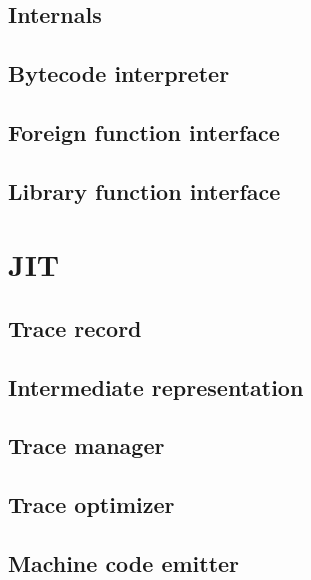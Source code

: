 \documentclass[12pt, oneside]{Thesis}
\begin{document}
  \chapter{Internals}
  \label{Chapt:Internals}
  

  \chapter{Bytecode interpreter}
  \label{Chapt:BI}
  

  \chapter{Foreign function interface}
  \label{Chapt:FFI}

  \chapter{Library function interface}
  \label{Chapt:LFI}

\part{JIT}
\label{Part:JIT}

  \chapter{Trace record}
  \label{Chapt:TR}
  

  \chapter{Intermediate representation}
  \label{Chapt:IR}
  

  \chapter{Trace manager}
  \label{Chapt:TM}
  

  \chapter{Trace optimizer}
  \label{Chapt:TO}
  

  \chapter{Machine code emitter}
  \label{Chapt:mcode}
\clearpage
{}
\appendix
\baselineskip=16pt
\end{document}
